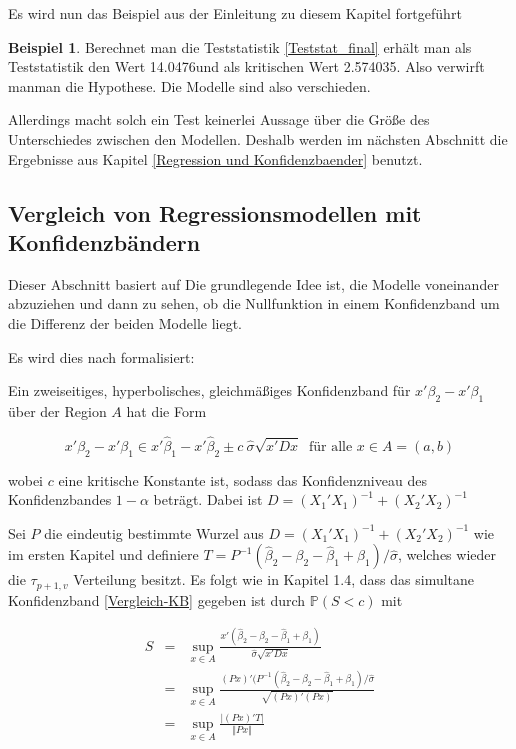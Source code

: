 \documentclass[12pt,a4paper]{article}
\theoremstyle{definition}
\newtheorem{Beispiel}[Definition]{Beispiel}
\theoremstyle{definition}
\theoremstyle{definition}
\theoremstyle{definition}
\newcommand{\TestWert}{14.0476}%
\newcommand{\kritWert}{2.574035}%
\newcommand{\EntscheidungHypothesen}{verwirft man}
\newcommand{\Modellesind}{verschieden}
\begin{document}
Es wird nun das Beispiel aus der Einleitung zu diesem Kapitel fortgeführt

\begin{Beispiel}
Berechnet man die Teststatistik \eqref{Teststat_final} erhält man als Teststatistik den Wert \TestWert und als kritischen Wert \kritWert . Also \EntscheidungHypothesen man die Hypothese. Die Modelle sind also \Modellesind .
\end{Beispiel}

Allerdings macht solch ein Test keinerlei Aussage über die Größe des Unterschiedes zwischen den Modellen. Deshalb werden im nächsten Abschnitt die Ergebnisse aus Kapitel \ref{Regression und Konfidenzbaender} benutzt.


\subsection{Vergleich von Regressionsmodellen mit Konfidenzbändern}
\label{Konfidenzbaender vergleich}
Dieser Abschnitt basiert auf \cite[119-121]{Liu64}
Die grundlegende Idee ist, die Modelle voneinander abzuziehen und dann zu sehen, ob die Nullfunktion in einem Konfidenzband um die Differenz der beiden Modelle liegt.

Es wird dies nach \cite[122]{Liu64} formalisiert: 

Ein zweiseitiges, hyperbolisches, gleichmäßiges Konfidenzband für $x'\beta_2 - x'\beta_1$ über der Region $A$ hat die Form

\begin{equation} \label{Vergleich-KB}
x'\beta_2-x'\beta_1 \in x' \hat{\beta}_1 - x' \hat{\beta}_2 \pm c ~ \hat{\sigma} \sqrt{x' D x} ~ \text{ für alle } x \in A = (a,b)
\end{equation}

wobei $c$ eine kritische Konstante ist, sodass das Konfidenzniveau des Konfidenzbandes $1-\alpha$ beträgt. Dabei ist $D = (X_1'X_1)^{-1} + (X_2'X_2)^{-1}$

Sei $P$ die eindeutig bestimmte Wurzel aus $D = (X_1'X_1)^{-1} + (X_2'X_2)^{-1}$ wie im ersten Kapitel und definiere $T=P^{-1}(\hat{\beta}_2 - \beta_2 - \hat{\beta}_1 + \beta_1)/\hat{\sigma}$, welches wieder die $\tau_{p+1,v}$ Verteilung besitzt. Es folgt wie in Kapitel 1.4, dass das simultane Konfidenzband \eqref{Vergleich-KB} gegeben ist durch $\mathbb{P}(S<c)$ mit

\begin{eqnarray*}
S &=& \sup_{x \in A} \frac{x' (\hat{\beta}_2-\beta_2-\hat{\beta}_1+\beta_1)}{\hat{\sigma}\sqrt{x' D x}}\\
&=& \sup_{x \in A} \frac{(Px)' (P^{-1} (\hat{\beta}_2-\beta_2-\hat{\beta}_1+\beta_1)/\hat{\sigma}}{\sqrt{(Px)'(Px)}} \\
&=& \sup_{x \in A} \frac{\vert (Px)' T \vert}{\Vert Px \Vert}
\end{eqnarray*}
\end{document}
